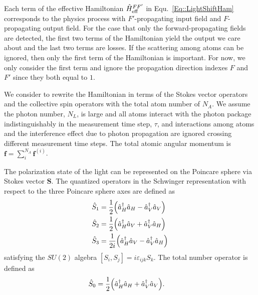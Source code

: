 \documentclass[preprint,aps,pra,onecolumn]{revtex4-1} %
\begin{document}
Each term of the effective Hamiltonian $\hat{H}_{\rm eff}^{FF'}$ in Equ.~\eqref{Eq::LightShiftHam} corresponds to the physics process with $F'$-propagating input field and $F$-propagating output field. For the case that only the forward-propagating fields are detected, the first two terms of the Hamiltonian yield the output we care about and the last two terms are losses. If the scattering among atoms can be ignored, then only the first term of the Hamiltonian is important. For now, we only consider the first term and ignore the propagation direction indexes $F$ and $F'$ since they both equal to $1$. 

We consider to rewrite the Hamiltonian in terms of the Stokes vector operators and the collective spin operators with the total atom number of $ N_A $. We assume the photon number, $ N_L $, is large and all atoms interact with the photon package indistinguishably in the measurement time step, $\tau$, and interactions among atoms and the interference effect due to photon propagation are ignored crossing different measurement time steps. The total atomic angular momentum is $\mathbf{f}=\sum^{N_A}_i\mathbf{f}^{(i)}$. 

The polarization state of the light can be represented on the Poincare sphere via Stokes vector $ \mathbf{S} $. The quantized operators in the Schwinger representation with respect to the three Poincare sphere axes are defined as  
\begin{align}
\hat{S}_1&= \frac{1}{2} \Big( \hat{a}_H^\dagger \hat{a}_H -  \hat{a}_V^\dagger \hat{a}_V \Big) \\
\hat{S}_2&= \frac{1}{2} \Big( \hat{a}_H^\dagger \hat{a}_V +  \hat{a}_V^\dagger \hat{a}_H \Big)\\
\hat{S}_3&= \frac{1}{2i} \Big( \hat{a}_H^\dagger \hat{a}_V -  \hat{a}_V^\dagger \hat{a}_H \Big)
\end{align}
satisfying the $ SU(2) $ algebra $ [S_i,S_j]=i\varepsilon_{ijk}S_k $. The total number operator is defined as
\begin{align}
\hat{S}_0&= \frac{1}{2} \Big( \hat{a}_H^\dagger \hat{a}_H +  \hat{a}_V^\dagger \hat{a}_V \Big).
\end{align}
\end{document}
